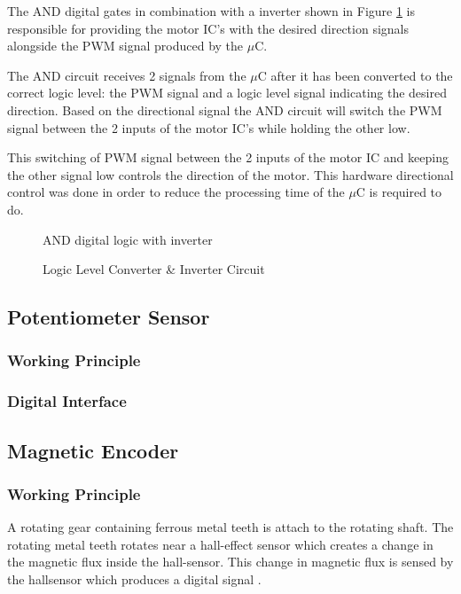 The AND digital gates in combination with a inverter shown in Figure \ref{fig:andCircuit} is responsible for providing the motor IC's with the desired direction signals alongside the PWM signal produced by the $\mu$C.

The AND circuit receives 2 signals from the $\mu$C after it has been converted to the correct logic level: the PWM signal and a logic level signal indicating the desired direction. Based on the directional signal the AND circuit will switch the PWM signal between the 2 inputs of the motor IC's while holding the other low. %

This switching of PWM signal between the 2 inputs of the motor IC and keeping the other signal low controls the direction of the motor. This hardware directional control was done in order to reduce the processing time of the $\mu$C is required to do.

\begin{figure}[h]
	\centering
	
	\caption{AND digital logic with inverter}
	\label{fig:andCircuit}
\end{figure}




\begin{figure}[h]
	\centering
	
	\caption{Logic Level Converter \& Inverter Circuit}
	\label{fig:interterCirc}
\end{figure}


\subsection{Potentiometer Sensor}
\subsubsection{Working Principle}




\subsubsection{Digital Interface}




\subsection{Magnetic Encoder}
\subsubsection{Working Principle}
A rotating gear containing ferrous metal teeth is attach to the rotating shaft. The rotating metal teeth rotates near a hall-effect sensor which creates a change in the magnetic flux inside the hall-sensor. This change in magnetic flux is sensed by the hallsensor which produces a digital signal \citep{hallsensor}.
